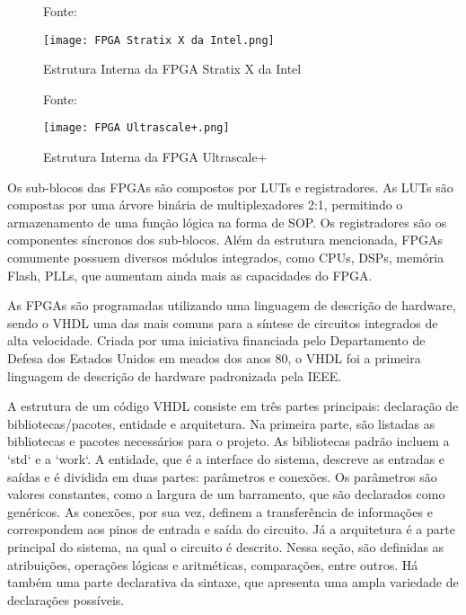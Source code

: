 \begin{figure}[h!]
    \centering
    \captionsetup{justification=centering}
    \caption*{Fonte: \cite{Pedroni2010}}
    \texttt{[image: FPGA Stratix X da Intel.png]}
    \caption{Estrutura Interna da FPGA Stratix X da Intel}
    \label{fig:Stratix}
\end{figure}

\begin{figure}[h!]
    \centering
    \captionsetup{justification=centering}
    \caption*{Fonte: \cite{Pedroni2010}}
    \texttt{[image: FPGA Ultrascale+.png]}
    \caption{Estrutura Interna da FPGA Ultrascale+}
    \label{fig:Ultrascale}
\end{figure}

Os sub-blocos das FPGAs são compostos por LUTs e registradores. As LUTs são compostas por uma árvore binária de multiplexadores 2:1, permitindo o armazenamento de uma função lógica na forma de SOP. Os registradores são os componentes síncronos dos sub-blocos. Além da estrutura mencionada, FPGAs comumente possuem diversos módulos integrados, como CPUs, DSPs, memória Flash, PLLs, que aumentam ainda mais as capacidades do FPGA.

As FPGAs são programadas utilizando uma linguagem de descrição de hardware, sendo o VHDL uma das mais comuns para a síntese de circuitos integrados de alta velocidade. Criada por uma iniciativa financiada pelo Departamento de Defesa dos Estados Unidos em meados dos anos 80, o VHDL foi a primeira linguagem de descrição de hardware padronizada pela IEEE.

A estrutura de um código VHDL consiste em três partes principais: declaração de bibliotecas/pacotes, entidade e arquitetura. Na primeira parte, são listadas as bibliotecas e pacotes necessários para o projeto. As bibliotecas padrão incluem a `std` e a `work`. A entidade, que é a interface do sistema, descreve as entradas e saídas e é dividida em duas partes: parâmetros e conexões. Os parâmetros são valores constantes, como a largura de um barramento, que são declarados como genéricos. As conexões, por sua vez, definem a transferência de informações e correspondem aos pinos de entrada e saída do circuito. Já a arquitetura é a parte principal do sistema, na qual o circuito é descrito. Nessa seção, são definidas as atribuições, operações lógicas e aritméticas, comparações, entre outros. Há também uma parte declarativa da sintaxe, que apresenta uma ampla variedade de declarações possíveis.

